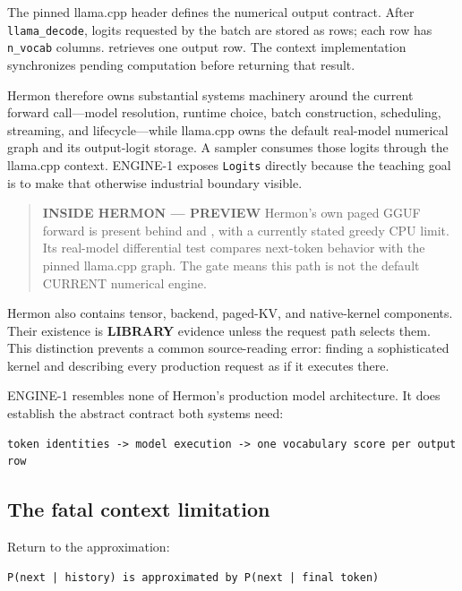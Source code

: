 \documentclass[
  10pt,
]{article}
\newcounter{none} %
\begin{document}
The pinned llama.cpp header defines the numerical output contract. After
\texttt{llama\_decode}, logits requested by the batch are stored as
rows; each row has \texttt{n\_vocab} columns.
\texttt{} retrieves one output row.
The context implementation synchronizes pending computation before
returning that result.

Hermon therefore owns substantial systems machinery around the current
forward call---model resolution, runtime choice, batch construction,
scheduling, streaming, and lifecycle---while llama.cpp owns the default
real-model numerical graph and its output-logit storage. A sampler
consumes those logits through the llama.cpp context. ENGINE-1 exposes
\texttt{Logits} directly because the teaching goal is to make that
otherwise industrial boundary visible.

\begin{quote}
\textbf{INSIDE HERMON --- PREVIEW} Hermon's own paged GGUF forward is
present behind \texttt{} and
\texttt{}, with a currently stated
greedy CPU limit. Its real-model differential test compares next-token
behavior with the pinned llama.cpp graph. The gate means this path is
not the default CURRENT numerical engine.
\end{quote}

Hermon also contains tensor, backend, paged-KV, and native-kernel
components. Their existence is \textbf{LIBRARY} evidence unless the
request path selects them. This distinction prevents a common
source-reading error: finding a sophisticated kernel and describing
every production request as if it executes there.

ENGINE-1 resembles none of Hermon's production model architecture. It
does establish the abstract contract both systems need:

\begin{verbatim}
token identities -> model execution -> one vocabulary score per output row
\end{verbatim}

\subsection{The fatal context
limitation}\label{the-fatal-context-limitation}

Return to the approximation:

\begin{verbatim}
P(next | history) is approximated by P(next | final token)
\end{verbatim}
\end{document}
